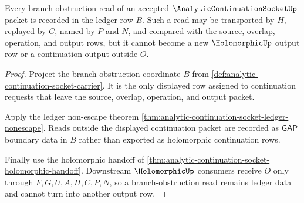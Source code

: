 \begin{theorem}
\label{thm:analytic-continuation-socket-ledger-exactness-obligation}
Every branch-obstruction read of an accepted $\AnalyticContinuationSocketUp$ packet is recorded in the ledger row $B$. Such a read may be transported by $H$, replayed by $C$, named by $P$ and $N$, and compared with the source, overlap, operation, and output rows, but it cannot become a new $\HolomorphicUp$ output row or a continuation output outside $O$.
\end{theorem}
\begin{proof}
Project the branch-obstruction coordinate $B$ from \autoref{def:analytic-continuation-socket-carrier}. It is the only displayed row assigned to continuation requests that leave the source, overlap, operation, and output packet.

Apply the ledger non-escape theorem \autoref{thm:analytic-continuation-socket-ledger-nonescape}. Reads outside the displayed continuation packet are recorded as $\mathsf{GAP}$ boundary data in $B$ rather than exported as holomorphic continuation rows.

Finally use the holomorphic handoff of \autoref{thm:analytic-continuation-socket-holomorphic-handoff}. Downstream $\HolomorphicUp$ consumers receive $O$ only through $F,G,U,A,H,C,P,N$, so a branch-obstruction read remains ledger data and cannot turn into another output row.
\end{proof}

